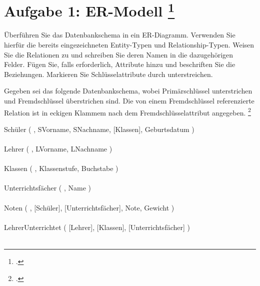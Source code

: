 \documentclass{lehramt-informatik-aufgabe}
\begin{document}

\section{Aufgabe 1: ER-Modell
\footcite[DB/ST - Herbst 2018 (nicht vertieft - 46116), Thema 2 Teilaufgabe 2 Aufgabe 5]{examen:46116:2018:09}
}

Überführen Sie das Datenbankschema in ein
ER-Diagramm. Verwenden Sie hierfür die
bereits eingezeichneten Entity-Typen und Relationship-Typen. Weisen Sie
die Relationen zu und schreiben Sie deren Namen
in die dazugehörigen Felder. Fügen Sie, falls erforderlich, Attribute
hinzu und beschriften Sie die Beziehungen. Markieren Sie
Schlüsselattribute durch unterstreichen.

Gegeben sei das folgende Datenbankschema, wobei Primärschlüssel
unterstrichen und Fremdschlüssel überstrichen sind. Die von einem
Fremdschlüssel referenzierte Relation ist in eckigen Klammem nach dem
Fremdschlüsselattribut angegeben.
\footcite{db:pu:wh}

\bigskip

{
  \noindent
  \ttfamily
  \footnotesize
  Schüler (%
    ,
    SVorname,
    SNachname,
    [Klassen],
    Geburtsdatum%
  )\\\\
  Lehrer (%
    ,
    LVorname,
    LNachname%
  )\\\\
  Klassen (%
    ,
    Klassenstufe,
    Buchstabe%
  )\\\\
  Unterrichtsfächer (%
    ,
    Name%
  )\\\\
  Noten (%
    ,
    [Schüler],
    [Unterrichtsfächer],
    Note,
    Gewicht%
  )\\\\
  LehrerUnterrichtet (%
    [Lehrer],
    [Klassen],
    [Unterrichtsfächer]%
  )\\\\
}

\begin{center}
\end{center}
\end{document}
